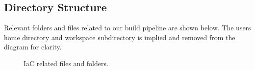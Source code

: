 \clearpage
\subsection{Directory Structure}

\justify
Relevant folders and files related to our build pipeline are shown
below. The users home directory and workspace subdirectory is implied
and removed from the diagram for clarity.
	
\begin{figure}[!htb]
	
	\caption{IaC related files and folders.}
\end{figure}
